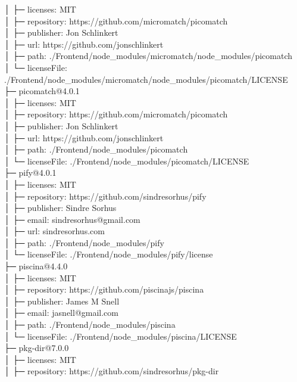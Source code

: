 \documentclass[
    paper=a4,
    twoside=false,
    parskip=half,
    listof=entryprefix,
    listof=totoc,
    index=totoc,
    bibliography=totoc,
    headsepline,
]{scrbook}
\begin{document}
    │  ├─ licenses: MIT\\
    │  ├─ repository: https://github.com/micromatch/picomatch\\
    │  ├─ publisher: Jon Schlinkert\\
    │  ├─ url: https://github.com/jonschlinkert\\
    │  ├─ path: ./Frontend/node\_modules/micromatch/node\_modules/picomatch\\
    │  └─ licenseFile: ./Frontend/node\_modules/micromatch/node\_modules/picomatch/LICENSE\\
    ├─ picomatch@4.0.1\\
    │  ├─ licenses: MIT\\
    │  ├─ repository: https://github.com/micromatch/picomatch\\
    │  ├─ publisher: Jon Schlinkert\\
    │  ├─ url: https://github.com/jonschlinkert\\
    │  ├─ path: ./Frontend/node\_modules/picomatch\\
    │  └─ licenseFile: ./Frontend/node\_modules/picomatch/LICENSE\\
    ├─ pify@4.0.1\\
    │  ├─ licenses: MIT\\
    │  ├─ repository: https://github.com/sindresorhus/pify\\
    │  ├─ publisher: Sindre Sorhus\\
    │  ├─ email: sindresorhus@gmail.com\\
    │  ├─ url: sindresorhus.com\\
    │  ├─ path: ./Frontend/node\_modules/pify\\
    │  └─ licenseFile: ./Frontend/node\_modules/pify/license\\
    ├─ piscina@4.4.0\\
    │  ├─ licenses: MIT\\
    │  ├─ repository: https://github.com/piscinajs/piscina\\
    │  ├─ publisher: James M Snell\\
    │  ├─ email: jasnell@gmail.com\\
    │  ├─ path: ./Frontend/node\_modules/piscina\\
    │  └─ licenseFile: ./Frontend/node\_modules/piscina/LICENSE\\
    ├─ pkg-dir@7.0.0\\
    │  ├─ licenses: MIT\\
    │  ├─ repository: https://github.com/sindresorhus/pkg-dir\\
\end{document}
